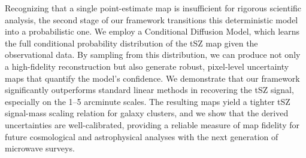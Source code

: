 \documentclass[]{article}
\begin{document}
Recognizing that a single point-estimate map is insufficient for rigorous scientific analysis, the second stage of our framework transitions this deterministic model into a probabilistic one. We employ a Conditional Diffusion Model, which learns the full conditional probability distribution of the tSZ map given the observational data. By sampling from this distribution, we can produce not only a high-fidelity reconstruction but also generate robust, pixel-level uncertainty maps that quantify the model's confidence. We demonstrate that our framework significantly outperforms standard linear methods in recovering the tSZ signal, especially on the 1--5 arcminute scales. The resulting maps yield a tighter tSZ signal-mass scaling relation for galaxy clusters, and we show that the derived uncertainties are well-calibrated, providing a reliable measure of map fidelity for future cosmological and astrophysical analyses with the next generation of microwave surveys.
\end{document}

